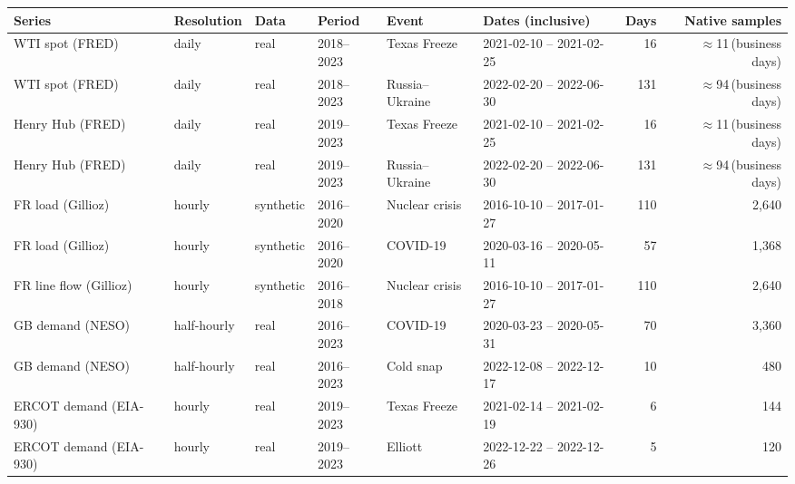 \begin{tabular}{llllllrr}
\toprule
Series & Resolution & Data & Period & Event & Dates (inclusive) & Days & Native samples \\
\midrule
WTI spot (FRED) & daily & real & 2018--2023 & Texas Freeze & 2021-02-10 -- 2021-02-25 & 16 & $\approx$11\,(business days) \\
WTI spot (FRED) & daily & real & 2018--2023 & Russia--Ukraine & 2022-02-20 -- 2022-06-30 & 131 & $\approx$94\,(business days) \\
Henry Hub (FRED) & daily & real & 2019--2023 & Texas Freeze & 2021-02-10 -- 2021-02-25 & 16 & $\approx$11\,(business days) \\
Henry Hub (FRED) & daily & real & 2019--2023 & Russia--Ukraine & 2022-02-20 -- 2022-06-30 & 131 & $\approx$94\,(business days) \\
FR load (Gillioz) & hourly & synthetic & 2016--2020 & Nuclear crisis & 2016-10-10 -- 2017-01-27 & 110 & 2,640 \\
FR load (Gillioz) & hourly & synthetic & 2016--2020 & COVID-19 & 2020-03-16 -- 2020-05-11 & 57 & 1,368 \\
FR line flow (Gillioz) & hourly & synthetic & 2016--2018 & Nuclear crisis & 2016-10-10 -- 2017-01-27 & 110 & 2,640 \\
GB demand (NESO) & half-hourly & real & 2016--2023 & COVID-19 & 2020-03-23 -- 2020-05-31 & 70 & 3,360 \\
GB demand (NESO) & half-hourly & real & 2016--2023 & Cold snap & 2022-12-08 -- 2022-12-17 & 10 & 480 \\
ERCOT demand (EIA-930) & hourly & real & 2019--2023 & Texas Freeze & 2021-02-14 -- 2021-02-19 & 6 & 144 \\
ERCOT demand (EIA-930) & hourly & real & 2019--2023 & Elliott & 2022-12-22 -- 2022-12-26 & 5 & 120 \\
\bottomrule
\end{tabular}
